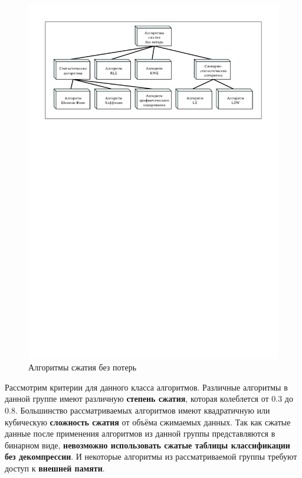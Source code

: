 \documentclass[oneside,final,12pt]{extarticle}
\begin{document}
            \begin{figure}[h]
                \centering
                \includegraphics[trim=0 1100 0 0,clip,width=\textwidth]{algorithms.pdf}
                \caption{Алгоритмы сжатия без потерь}
                \label{img:algorithms}
            \end{figure}           
            Рассмотрим критерии для данного класса алгоритмов. Различные алгоритмы в данной группе имеют различную \textbf{степень сжатия}, 
            которая колеблется от 0.3 до 0.8. Большинство рассматриваемых алгоритмов имеют квадратичную или кубическую \textbf{сложность сжатия} 
            от объёма сжимаемых данных. Так как сжатые данные после применения алгоритмов из данной группы представляются в бинарном виде,
            \textbf{невозможно использовать сжатые таблицы классификации без декомпрессии}. И некоторые алгоритмы из рассматриваемой группы требуют доступ к \textbf{внешней памяти}.
\end{document}
